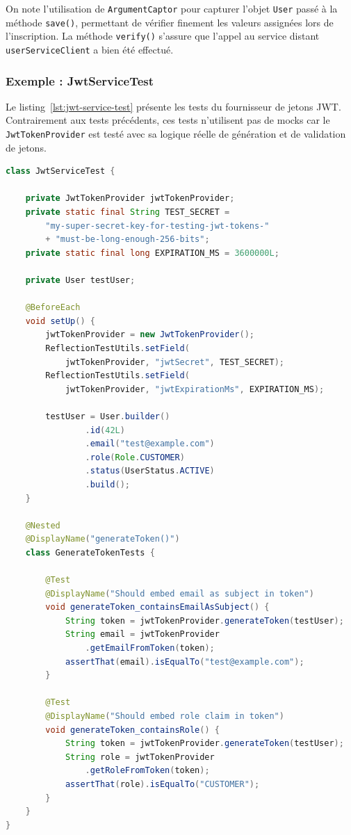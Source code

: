 On note l'utilisation de \texttt{ArgumentCaptor} pour capturer l'objet \texttt{User}
passé à la méthode \texttt{save()}, permettant de vérifier finement les valeurs
assignées lors de l'inscription. La méthode \texttt{verify()} s'assure que l'appel
au service distant \texttt{userServiceClient} a bien été effectué.

\subsubsection{Exemple : JwtServiceTest}

Le listing~\ref{lst:jwt-service-test} présente les tests du fournisseur de jetons JWT.
Contrairement aux tests précédents, ces tests n'utilisent pas de mocks car le
\texttt{JwtTokenProvider} est testé avec sa logique réelle de génération et de
validation de jetons.

\begin{lstlisting}[language=Java, caption={Test de génération JWT -- JwtServiceTest.java}, label={lst:jwt-service-test}]
class JwtServiceTest {

    private JwtTokenProvider jwtTokenProvider;
    private static final String TEST_SECRET =
        "my-super-secret-key-for-testing-jwt-tokens-"
        + "must-be-long-enough-256-bits";
    private static final long EXPIRATION_MS = 3600000L;

    private User testUser;

    @BeforeEach
    void setUp() {
        jwtTokenProvider = new JwtTokenProvider();
        ReflectionTestUtils.setField(
            jwtTokenProvider, "jwtSecret", TEST_SECRET);
        ReflectionTestUtils.setField(
            jwtTokenProvider, "jwtExpirationMs", EXPIRATION_MS);

        testUser = User.builder()
                .id(42L)
                .email("test@example.com")
                .role(Role.CUSTOMER)
                .status(UserStatus.ACTIVE)
                .build();
    }

    @Nested
    @DisplayName("generateToken()")
    class GenerateTokenTests {

        @Test
        @DisplayName("Should embed email as subject in token")
        void generateToken_containsEmailAsSubject() {
            String token = jwtTokenProvider.generateToken(testUser);
            String email = jwtTokenProvider
                .getEmailFromToken(token);
            assertThat(email).isEqualTo("test@example.com");
        }

        @Test
        @DisplayName("Should embed role claim in token")
        void generateToken_containsRole() {
            String token = jwtTokenProvider.generateToken(testUser);
            String role = jwtTokenProvider
                .getRoleFromToken(token);
            assertThat(role).isEqualTo("CUSTOMER");
        }
    }
}
\end{lstlisting}

